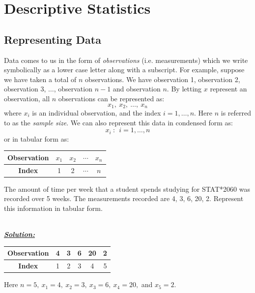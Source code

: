 \chapter{Descriptive Statistics}
\label{sectionDescriptiveStatistics}

\section{Representing Data}

Data comes to us in the form of \textit{observations} (i.e. measurements) which we write symbolically as a lower case letter along with a subscript. For example, suppose we have taken a total of $n$ observations. We have observation 1, observation 2, observation 3, $\hdots$, observation $n-1$ and observation $n$. By letting $x$ represent an observation, all $n$ observations can be represented as:
$$x_1,~x_2,~ \hdots ,~ x_n$$ where $x_i$ is an individual observation, and the index $i=1, \ldots , n$. Here $n$ is referred to as the \textit{sample size}. We can also represent this data in condensed form as:
$$x_i~: \ \ i=1, \hdots , n$$
or in tabular form as:
\begin{center}
\def\arraystretch{1.5}
\begin{tabular}{|c|c|c|c|c|} \hline
\textbf{Observation} &$x_1$&$x_2$&$\cdots$&$x_n$
 \\ \hline
\textbf{Index} &1&2&$\cdots$&$n$ \\ \hline
\end{tabular}
\end{center}
\hfill

\begin{example}
The amount of time per week that a student spends studying for  STAT*2060 was recorded over 5 weeks. The measurements recorded are 4, 3, 6, 20, 2.
Represent this information in tabular form.


\hfill\\
{\emph{\textbf{\underline{Solution:}}}}\\

\begin{center}
\def\arraystretch{1.5}
\begin{tabular}{|c|c|c|c|c|c|}\hline
\textbf{Observation} & 4 & 3 & 6 & 20 & 2
 \\ \hline
\textbf{Index} & 1 & 2 & 3 & 4 & 5 \\ \hline
\end{tabular}
\end{center}
Here $n=5,~x_1=4,~x_2=3,~x_3=6,~x_4=20,$ and $x_5=2$.

\end{example}

